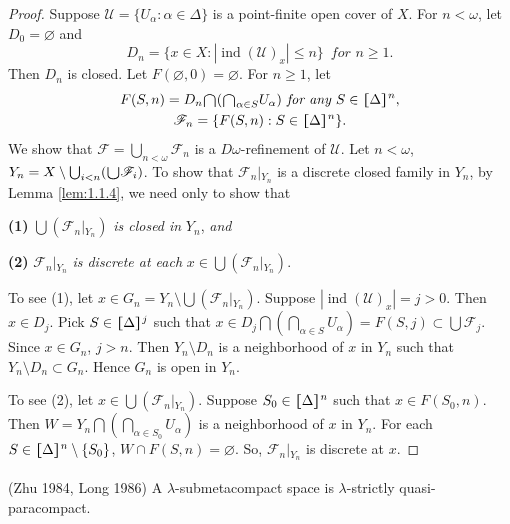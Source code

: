 \documentclass[ch3.tex]{subfiles}
\begin{document}
\begin{proof}
Suppose $\mathscr{U} = \{ U_\alpha: \alpha \in \Delta \}$ is a point-finite open 
cover of $X$. For $n < \omega$, let $D_0= \varnothing$ and
$$D_n = \{ x \in X: |\operatorname{ind}(\mathscr{U})_x| \le n \} \, \textit{ for } n \ge 1.$$
\noindent Then $D_n$ is closed. Let $F(\varnothing, 0) = \varnothing$. 
For $n \ge 1$, let
\begin{gather*}
	F(S, n) = D_n\raisebox{-2pt}{\scalebox{1.5}{$\cap$}}
	(\raisebox{-2pt}{\scalebox{1.5}{$\cap$}}_{\alpha \in S} U_\alpha) \textit{ for any } 
	S \in \hstretch{1.8}{[}\Delta\hstretch{1.8}{]}^n, \\
	\mathscr{F}_n= \{F(S, n): S \in \hstretch{1.8}{[}\Delta\hstretch{1.8}{]}^n\}.
\end{gather*}
We show that $\mathscr{F} = \bigcup_{n<\omega}\mathscr{F}_n$ is a 
$D\omega$-refinement of $\mathscr{U}$. Let $n < \omega$, 
$Y_n = X \setminus \bigcup_{i<n}( \raisebox{-2pt}{\scalebox{1.5}{$\cup$}}\mathscr{F}_i)$. To show that 
$\mathscr{F}_n\vert{}_{Y_n}$ is a discrete closed family in $Y_n$, 
by Lemma \ref{lem:1.1.4}, we need only to show that

\textbf{(1)} 
$\bigcup(\mathscr{F}_n\vert{}_{Y_n})$ \textit{ is closed in } $Y_n$, \textit{and}

\textbf{(2)}  $\mathscr{F}_n\vert{}_{Y_n}$ \textit{ is discrete at each }
$x \in \bigcup(\mathscr{F}_n\vert{}_{Y_n})$.

To see (1), let $x\in G_n = Y_n \setminus \bigcup(\mathscr{F}_n\vert{}_{Y_n})$. 
Suppose $|\operatorname{ind}(\mathscr{U})_x| = j>0$. Then $x \in D_j$. 
Pick $S \in \hstretch{1.8}{[}\Delta\hstretch{1.8}{]}^j$ such that 
$x \in D_j\bigcap (\bigcap_{\alpha \in S} U_\alpha) = F(S, j) \subset \bigcup \mathscr{F}_j$.
Since $x \in G_n$, $j > n$. Then $Y_n \setminus D_n$ is a neighborhood of $x$ in $Y_n$ 
such that $Y_n \setminus D_n \subset G_n$. Hence $G_n$ is open in $Y_n$.

To see (2), let $x \in \bigcup(\mathscr{F}_n\vert{}_{Y_n})$. Suppose $S_0 \in \hstretch{1.8}{[}\Delta\hstretch{1.8}{]}^n$ 
such that $x \in F(S_0, n)$. Then $W = Y_n \bigcap (\bigcap_{\alpha \in S_0} U_\alpha)$ 
is a neighborhood of $x$ in $Y_n$. 
For each $S \in \hstretch{1.8}{[}\Delta\hstretch{1.8}{]}^n \setminus \{S_0\}$, $W \cap F(S, n) = \varnothing$. 
So, $\mathscr{F}_n\vert{}_{Y_n}$ is discrete at $x$.
\end{proof}

{\theorem{}  \label{th:3.2.5}
\textup{(\hstretch{1.8}{[}Zhu 1984\hstretch{1.8}{]}\textsuperscript{\cite{Zhu1984}},
\hstretch{1.8}{[}Long 1986\hstretch{1.8}{]}\textsuperscript{\cite{Long}})} 
A $\lambda$-submetacompact space is $\lambda$-strictly quasi-paracompact.
}
\end{document}
